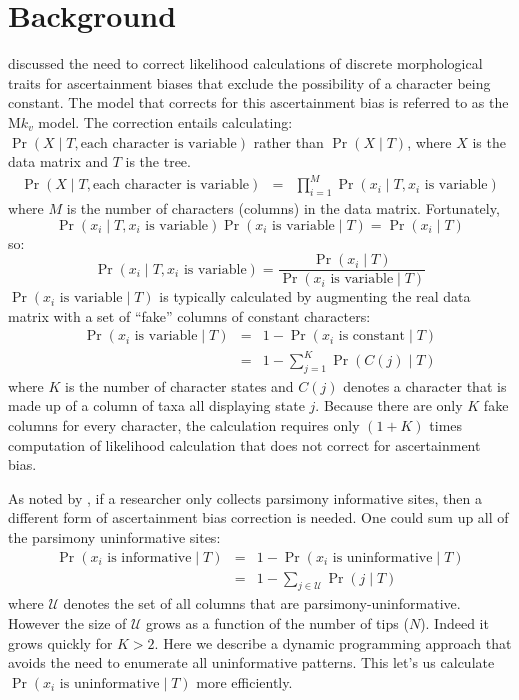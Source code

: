 \documentclass[11pt]{article}
\begin{document}
\tableofcontents
\section{Background}
\citet{Lewis2001} discussed the need to correct likelihood calculations of discrete morphological traits for ascertainment biases that exclude the possibility of a character being constant.
The model that corrects for this ascertainment bias is referred to as the M$k_v$ model.
The correction entails calculating:
$ \Pr(X \mid T, \mbox{each character is variable})$ rather than
$\Pr(X \mid T)$, where $X$ is the data matrix and $T$ is the tree.
\begin{eqnarray*}
\Pr(X \mid T, \mbox{each character is variable}) & = & \prod_{i=1}^M\Pr(x_i \mid T, x_i\mbox{ is variable})
\end{eqnarray*}
where $M$ is the number of characters (columns) in the data matrix.
Fortunately,
$$\Pr(x_i \mid T, x_i\mbox{ is variable})\Pr(x_i\mbox{ is variable}\mid T) = \Pr(x_i\mid T)$$
so:
$$\Pr(x_i \mid T, x_i\mbox{ is variable}) = \frac{\Pr(x_i\mid T)}{\Pr(x_i\mbox{ is variable}\mid T)}$$
$\Pr(x_i\mbox{ is variable}\mid T)$ is typically calculated by augmenting the real data matrix with a set of ``fake'' columns of constant characters:
\begin{eqnarray*}
\Pr(x_i\mbox{ is variable}\mid T) & = & 1 -\Pr(x_i\mbox{ is constant}\mid T) \\
& = & 1 - \sum_{j=1}^K\Pr(C(j)\mid T)
\end{eqnarray*}
where $K$ is the number of character states and $C(j)$ denotes a 
character that is made up of a column of taxa all displaying state $j$.
Because there are only $K$ fake columns for every character, the calculation requires only $(1+K)$ times computation of likelihood calculation that does not correct for ascertainment bias.


As noted by \citet{MatzkeI2018}, if a researcher only collects parsimony informative sites, then a different form of ascertainment bias correction is needed.
One could sum up all of the parsimony uninformative sites:
\begin{eqnarray*}
\Pr(x_i\mbox{ is informative}\mid T) & = & 1 -\Pr(x_i\mbox{ is uninformative}\mid T) \\
& = & 1 - \sum_{j\in \mathcal{U}} \Pr(j\mid T)
\end{eqnarray*}
where $\mathcal{U}$ denotes the set of all columns that are parsimony-uninformative.
However the size of $\mathcal{U}$ grows as a function of the number of tips ($N$).
Indeed it grows quickly for $K>2$.
Here we describe a dynamic programming approach that avoids the need to
	enumerate all uninformative patterns.
This let's us calculate
$\Pr(x_i\mbox{ is uninformative}\mid T)$
more efficiently.
\end{document}
